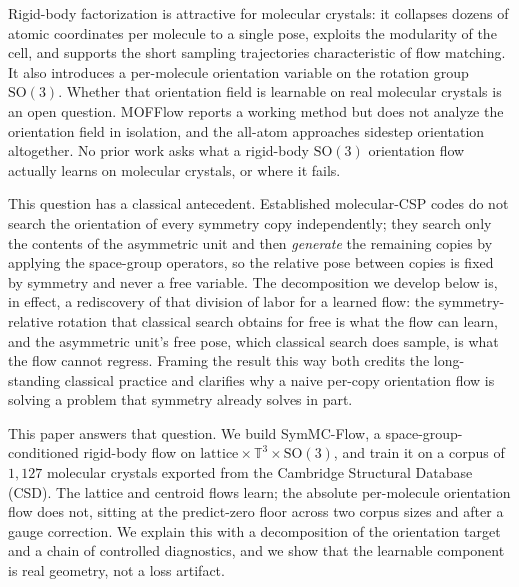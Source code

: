 \documentclass[11pt]{article}
\begin{document}
Rigid-body factorization is attractive for molecular crystals: it collapses
dozens of atomic coordinates per molecule to a single pose, exploits the
modularity of the cell, and supports the short sampling trajectories
characteristic of flow matching\cite{lipman2023flowmatching,chen2024riemannian}.
It also introduces a per-molecule orientation variable on the rotation group
$\mathrm{SO}(3)$. Whether that orientation field is learnable on real molecular
crystals is an open question. MOFFlow reports a working method but does not
analyze the orientation field in isolation, and the all-atom approaches sidestep
orientation altogether. No prior work asks what a rigid-body $\mathrm{SO}(3)$
orientation flow actually learns on molecular crystals, or where it fails.

This question has a classical antecedent. Established molecular-CSP codes do not
search the orientation of every symmetry copy independently; they search only
the contents of the asymmetric unit and then \emph{generate} the remaining
copies by applying the space-group operators, so the relative pose between
copies is fixed by symmetry and never a free
variable\cite{price2023blindtest7,obrien2021dataefficient}. The decomposition
we develop below is, in effect, a rediscovery of that division of labor for a
learned flow: the symmetry-relative rotation that classical search obtains for
free is what the flow can learn, and the asymmetric unit's free pose, which
classical search does sample, is what the flow cannot regress. Framing the
result this way both credits the long-standing classical practice and clarifies
why a naive per-copy orientation flow is solving a problem that symmetry already
solves in part.

This paper answers that question. We build SymMC-Flow, a
space-group-conditioned rigid-body flow on
$\text{lattice}\times\mathbb{T}^3\times\mathrm{SO}(3)$, and train it on a
corpus of $1{,}127$ molecular crystals exported from the Cambridge Structural
Database (CSD)\cite{groom2016csd}. The lattice and centroid flows learn; the
absolute per-molecule
orientation flow does not, sitting at the predict-zero floor across two corpus
sizes and after a gauge correction. We explain this with a decomposition of the
orientation target and a chain of controlled diagnostics, and we show that the
learnable component is real geometry, not a loss artifact.
\end{document}
